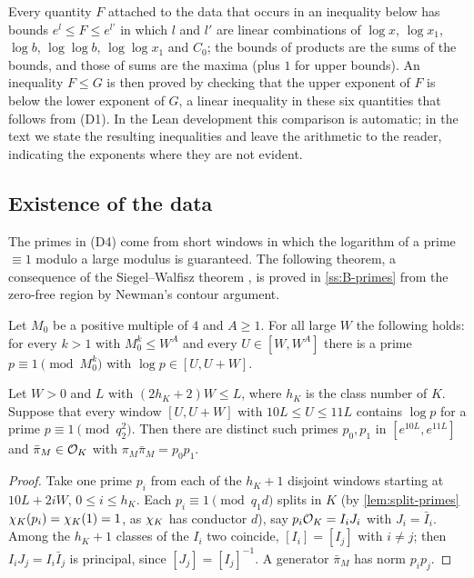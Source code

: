 \begin{remark}\label{rem:magnitudes}
Every quantity $F$ attached to the data that occurs in an inequality below has bounds
$e^{l}\le F\le e^{l'}$ in which $l$ and $l'$ are linear combinations of $\log x$, $\log x_1$,
$\log b$, $\log\log b$, $\log\log x_1$ and $C_0$; the bounds of products are the sums of the bounds,
and those of sums are the maxima (plus $1$ for upper bounds). An inequality $F\le G$ is then proved by
checking that the upper exponent of $F$ is below the lower exponent of $G$, a linear inequality in
these six quantities that follows from (D1). In the Lean development this comparison is automatic;
in the text we state the resulting inequalities and leave the arithmetic to the reader, indicating
the exponents where they are not evident.
\end{remark}

\subsection{Existence of the data}\label{ss:existence}
The primes in (D4) come from short windows in which the logarithm of a prime $\equiv1$ modulo a
large modulus is guaranteed. The following theorem, a consequence of the Siegel--Walfisz theorem
\cite[Cor.~11.19]{MontgomeryVaughan2007}, is proved in \cref{ss:B-primes} from the zero-free region
by Newman's contour argument.

\begin{theorem}\label{thm:prime-windows}
Let $M_0$ be a positive multiple of $4$ and $A\ge1$. For all large $W$ the following holds: for every
$k>1$ with $M_0^k\le W^A$ and every $U\in[W,W^A]$ there is a prime $p\equiv1\pmod{M_0^k}$ with
$\log p\in[U,U+W]$.
\end{theorem}

\begin{lemma}\label{lem:prime-pair}
Let $W>0$ and $L$ with $(2h_K+2)W\le L$, where $h_K$ is the class number of $K$. Suppose that every
window $[U,U+W]$ with $10L\le U\le11L$ contains $\log p$ for a prime $p\equiv1\pmod{q_2^2}$. Then there
are distinct such primes $p_0,p_1$ in $[e^{10L},e^{11L}]$ and $\bar\pi_M\in\mathcal{O}_K$ with
$\pi_M\bar\pi_M=p_0p_1$.
\end{lemma}

\begin{proof}
Take one prime $p_i$ from each of the $h_K+1$ disjoint windows starting at $10L+2iW$,
$0\le i\le h_K$. Each $p_i\equiv1\pmod{q_1d}$ splits in $K$ (by \cref{lem:split-primes}
$\chi_K(p_i)=\chi_K(1)=1$, as $\chi_K$ has conductor $d$), say $p_i\mathcal{O}_K=I_iJ_i$ with $J_i=\bar I_i$.
Among the $h_K+1$ classes of the $I_i$ two coincide, $[I_i]=[I_j]$ with $i\ne j$; then
$I_iJ_j=I_i\bar I_j$ is principal, since $[J_j]=[I_j]^{-1}$. A generator $\bar\pi_M$ has norm $p_ip_j$.
\end{proof}


